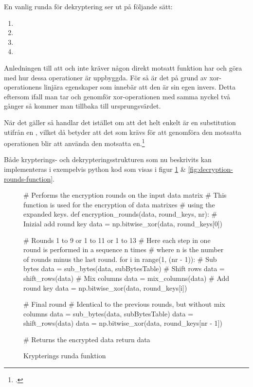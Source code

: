 En vanlig runda för dekryptering ser ut på följande sätt:

\begin{enumerate}
    \item {}
    \item {}
    \item {}
    \item {}
\end{enumerate}

Anledningen till att  och  inte kräver någon direkt motsatt funktion har och göra med hur dessa operationer
är uppbyggda. För  så är det på grund av \gls{xor}-operationens linjära egenskaper som innebär att den är sin egen invers.
Detta eftersom ifall man tar och genomför \gls{xor}-operationen med samma nyckel två gånger så kommer man tillbaka till ursprungsvärdet.

När det gäller 
så handlar det istället om att det helt enkelt är en substitution utifrån en , vilket då betyder att det som krävs för att genomföra den motsatta operationen
blir att använda den motsatta en.\footcite{daemen1999aes}

Både krypterings- och dekrypteringsstrukturen som nu beskrivits kan implementeras i exempelvis \gls{python} kod som visas i figur \ref{fig:encryption-rounds-function} \& \ref{fig:decryption-rounds-function}.

\begin{figure}[H]
    \centering
    \begin{python}
    # Performs the encryption rounds on the input data matrix
    # This function is used for the encryption of data matrixes
    # using the expanded keys.
    def encryption_rounds(data, round_keys, nr):
        # Inizial add round key
        data = np.bitwise_xor(data, round_keys[0])

        # Rounds 1 to 9 or 1 to 11 or 1 to 13
        # Here each step in one round is performed in a sequence n times
        # where n is the number of rounds minus the last round.
        for i in range(1, (nr - 1)):
            # Sub bytes
            data = sub_bytes(data, subBytesTable)
            # Shift rows
            data = shift_rows(data)
            # Mix columns
            data = mix_columns(data)
            # Add round key
            data = np.bitwise_xor(data, round_keys[i])

        # Final round
        # Identical to the previous rounds, but without mix columns
        data = sub_bytes(data, subBytesTable)
        data = shift_rows(data)
        data = np.bitwise_xor(data, round_keys[nr - 1])

        # Returns the encrypted data
        return data

    \end{python}
    \caption{Krypterings runda funktion}
    \label{fig:encryption-rounds-function}
\end{figure}


